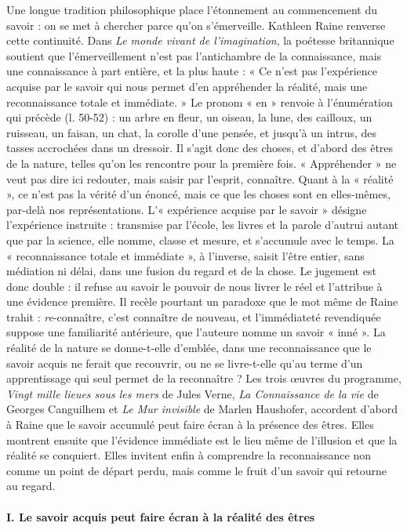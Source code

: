 \documentclass[11pt,a4paper]{article}
\begin{document}
Une longue tradition philosophique place l'étonnement au commencement du savoir : on se met à chercher parce qu'on s'émerveille. Kathleen Raine renverse cette continuité. Dans \emph{Le monde vivant de l'imagination}, la poétesse britannique soutient que l'émerveillement n'est pas l'antichambre de la connaissance, mais une connaissance à part entière, et la plus haute : « Ce n'est pas l'expérience acquise par le savoir qui nous permet d'en appréhender la réalité, mais une reconnaissance totale et immédiate. » Le pronom « en » renvoie à l'énumération qui précède (l. 50-52) : un arbre en fleur, un oiseau, la lune, des cailloux, un ruisseau, un faisan, un chat, la corolle d'une pensée, et jusqu'à un intrus, des tasses accrochées dans un dressoir. Il s'agit donc des choses, et d'abord des êtres de la nature, telles qu'on les rencontre pour la première fois. « Appréhender » ne veut pas dire ici redouter, mais saisir par l'esprit, connaître. Quant à la « réalité », ce n'est pas la vérité d'un énoncé, mais ce que les choses sont en elles-mêmes, par-delà nos représentations. L'« expérience acquise par le savoir » désigne l'expérience instruite : transmise par l'école, les livres et la parole d'autrui autant que par la science, elle nomme, classe et mesure, et s'accumule avec le temps. La « reconnaissance totale et immédiate », à l'inverse, saisit l'être entier, sans médiation ni délai, dans une fusion du regard et de la chose. Le jugement est donc double : il refuse au savoir le pouvoir de nous livrer le réel et l'attribue à une évidence première. Il recèle pourtant un paradoxe que le mot même de Raine trahit : \emph{re}-connaître, c'est connaître de nouveau, et l'immédiateté revendiquée suppose une familiarité antérieure, que l'auteure nomme un savoir « inné ». La réalité de la nature se donne-t-elle d'emblée, dans une reconnaissance que le savoir acquis ne ferait que recouvrir, ou ne se livre-t-elle qu'au terme d'un apprentissage qui seul permet de la reconnaître ? Les trois œuvres du programme, \emph{Vingt mille lieues sous les mers} de Jules Verne, \emph{La Connaissance de la vie} de Georges Canguilhem et \emph{Le Mur invisible} de Marlen Haushofer, accordent d'abord à Raine que le savoir accumulé peut faire écran à la présence des êtres. Elles montrent ensuite que l'évidence immédiate est le lieu même de l'illusion et que la réalité se conquiert. Elles invitent enfin à comprendre la reconnaissance non comme un point de départ perdu, mais comme le fruit d'un savoir qui retourne au regard.

\hypertarget{i.-le-savoir-acquis-peut-faire-uxe9cran-uxe0-la-ruxe9alituxe9-des-uxeatres}{%
\paragraph{I. Le savoir acquis peut faire écran à la réalité des êtres}\label{i.-le-savoir-acquis-peut-faire-uxe9cran-uxe0-la-ruxe9alituxe9-des-uxeatres}}
\end{document}
